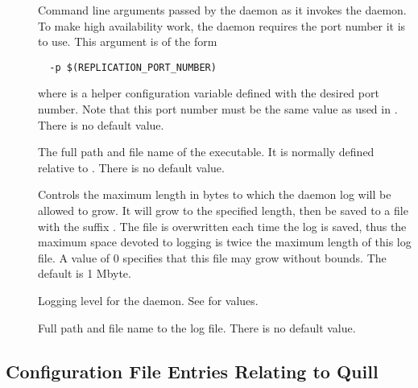 \begin{description}
\item[]
  \label{param:ReplicationArgs}
  Command line arguments passed by the  daemon
  as it invokes the  daemon.
  To make high availability work, the  daemon
  requires the port number it is to use.
  This argument is of the form
  \begin{verbatim}
  -p $(REPLICATION_PORT_NUMBER)
  \end{verbatim}
  where  is a helper configuration
  variable defined with the desired port number.
  Note that this port number must be the same value as
  used in .
  There is no default value.

\item[]
  \label{param:Replication}
  The full path and file name of the  executable.
  It is normally defined relative to .
  There is no default value.

\item[]
  \label{param:MaxReplicationLog}
  Controls the maximum length in bytes to which the 
  daemon log will be allowed to grow. It will grow to the specified length,
  then be saved to a file with the suffix .
  The   file is overwritten each time the log is saved,
  thus the maximum space devoted to logging is twice the maximum length
  of this log file.
  A value of 0 specifies that this file may grow without bounds.
  The default is 1 Mbyte.

\item[]
  \label{param:ReplicationDebug}
  Logging level for the  daemon.
  See  for values.


\item[]
  \label{param:ReplicationLog}
  Full path and file name to the log file.
  There is no default value.

\end{description}


\subsection{\label{sec:Quill-Config-File-Entries}Configuration File
Entries Relating to Quill}

